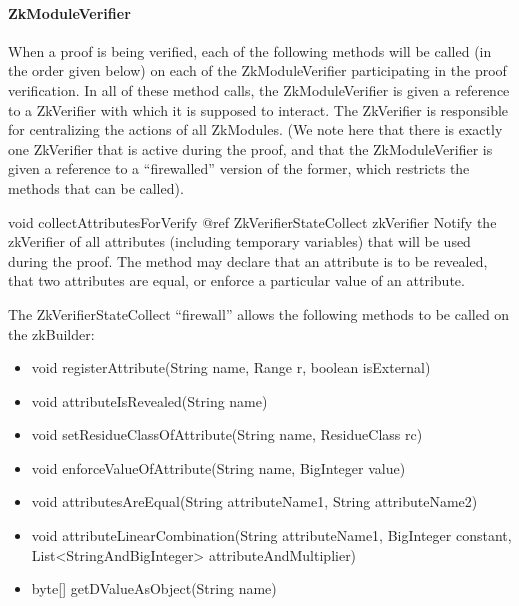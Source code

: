 \paragraph{ZkModuleVerifier}
    \label{sec:intf:zkmoduleverifier}
    When a proof is being verified, each of the following methods will be called (in the order
    given below) on each of the ZkModuleVerifier participating in the proof verification.
    In all of these method calls, the ZkModuleVerifier is given a reference to a ZkVerifier with
    which it is supposed to interact. The ZkVerifier is responsible for centralizing the
    actions of all ZkModules.
    (We note here that there is exactly one ZkVerifier that is active during the proof, and that
    the ZkModuleVerifier is given a reference to a ``firewalled'' version of the former, which restricts the
    methods that can be called).
    \begin{method}
    {void}
    {collectAttributesForVerify}
    {
      {@ref ZkVerifierStateCollect zkVerifier}
    }
    Notify the zkVerifier of all attributes (including temporary variables) that will be used during the proof.
    The method may declare that an attribute is to be revealed, that two attributes are equal, or enforce
    a particular value of an attribute.

    The ZkVerifierStateCollect ``firewall'' allows the following methods to be called on the zkBuilder:
      \begin{itemize}
      \item void registerAttribute(String name, Range r, boolean isExternal)
      \item void attributeIsRevealed(String name)
      \item void setResidueClassOfAttribute(String name, ResidueClass rc)
      \item void enforceValueOfAttribute(String name, BigInteger value)
      \item void attributesAreEqual(String attributeName1, String attributeName2)
      \item void attributeLinearCombination(String attributeName1, BigInteger constant, List<StringAndBigInteger> attributeAndMultiplier)
      \item byte[] getDValueAsObject(String name)
      \end{itemize}
    \end{method}
